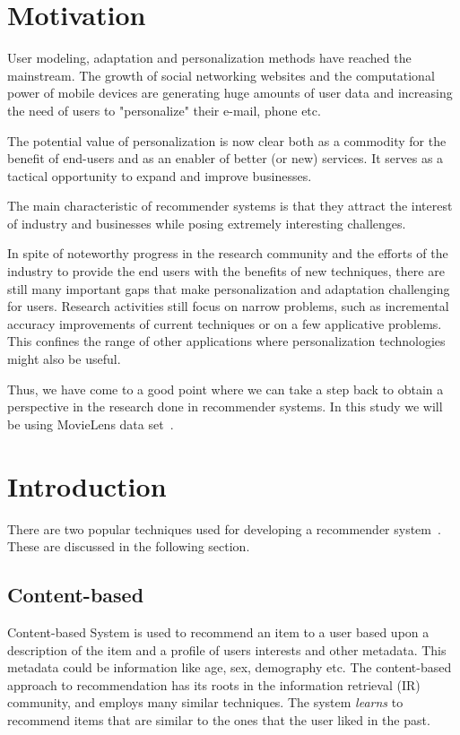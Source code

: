 \section{Motivation}

 User modeling, adaptation and personalization methods have reached the mainstream. The growth of social networking websites and the computational power of mobile devices are generating huge amounts of user data and increasing the need of users to "personalize" their e-mail, phone etc.

 The potential value of personalization is now clear both as a commodity for the benefit of end-users and as an enabler of better (or new) services. It serves as a tactical opportunity to expand and improve businesses.

 The main characteristic of recommender systems is that they attract the interest of industry and businesses while posing extremely interesting challenges.

 In spite of noteworthy progress in the research community and the efforts of the industry to provide the end users with the benefits of new techniques, there are still many important gaps that make personalization and adaptation challenging for users. Research activities still focus on narrow problems, such as incremental accuracy improvements of current techniques or on a few applicative problems. This confines the range of other applications where personalization technologies might also be useful.

 Thus, we have come to a good point where we can take a step back to obtain a perspective in the research done in recommender systems. In this study we will be using MovieLens data set~\cite{movielens}.

\section{Introduction}
\label{sec:approaches}
There are two popular techniques used for developing a recommender system~\cite{nbrsurvey}. These are discussed in the following section.
\subsection{Content-based}
Content-based System is used to recommend an item to a user based upon a description of the item and a profile of users interests and other metadata. This metadata could be information like age, sex, demography etc. The content-based approach to recommendation has its roots in the information retrieval (IR) community, and employs many similar techniques. The system \textit{learns} to recommend items that are similar to the ones that the user liked in the past. 

